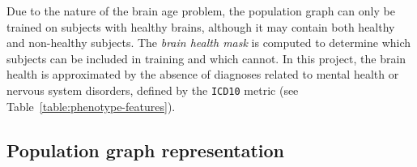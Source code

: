 Due to the nature of the brain age problem, the population graph can only be trained on subjects with healthy brains, although it may contain both healthy and non-healthy subjects. The \textit{brain health mask} is computed to determine which subjects can be included in training and which cannot. In this project, the brain health is approximated by the absence of diagnoses related to mental health or nervous system disorders, defined by the \texttt{ICD10} metric (see Table~\ref{table:phenotype-features}).

\subsection{Population graph representation}

\renewcommand{\arraystretch}{1.25}
